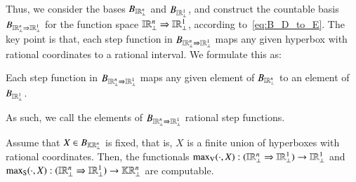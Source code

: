 \documentclass[11pt,times]{article}
\begin{document}
Thus, we consider the bases $B_{\intvaldom[\R^n\lift]}$ and
$B_{\intvaldom[\R^1\lift]}$, and construct the countable basis
$B_{\intvaldom[\R^n\lift] \Rightarrow \intvaldom[\R^1\lift]}$ for the
function space
$\intvaldom[\R^n\lift] \Rightarrow \intvaldom[\R^1\lift]$, according
to~\eqref{eq:B_D_to_E}. The key point is that, each step function in
$B_{\intvaldom[\R^n\lift] \Rightarrow \intvaldom[\R^1\lift]}$ maps any
given hyperbox with rational coordinates to a rational interval. We
formulate this as:

\begin{proposition}
  \label{prop:rational_step_fun}
  Each step function in
  $B_{\intvaldom[\R^n\lift] \Rightarrow \intvaldom[\R^1\lift]}$ maps
  any given element of $B_{\intvaldom[\R^n\lift]}$ to an element of~$B_{\intvaldom[\R^1\lift]}$. 
\end{proposition}

As such, we call the elements of
$B_{\intvaldom[\R^n\lift] \Rightarrow \intvaldom[\R^1\lift]}$ rational
step functions.



\begin{theorem}
  \label{thm:computability}
  Assume that $X \in B_{\kCPPO{\R^n\lift}}$ is fixed, that is, $X$ is
  a finite union of hyperboxes with rational coordinates. Then,
  the functionals
  $\maxV(\cdot , X): (\intvaldom[\R^n\lift] \Rightarrow
  \intvaldom[\R^1\lift]) \to \intvaldom[\R^1\lift]$ and
  $\maxS( \cdot, X): (\intvaldom[\R^n\lift] \Rightarrow
  \intvaldom[\R^1\lift]) \to \kCPPO{\R^n\lift}$ are computable.  
\end{theorem}
\end{document}
